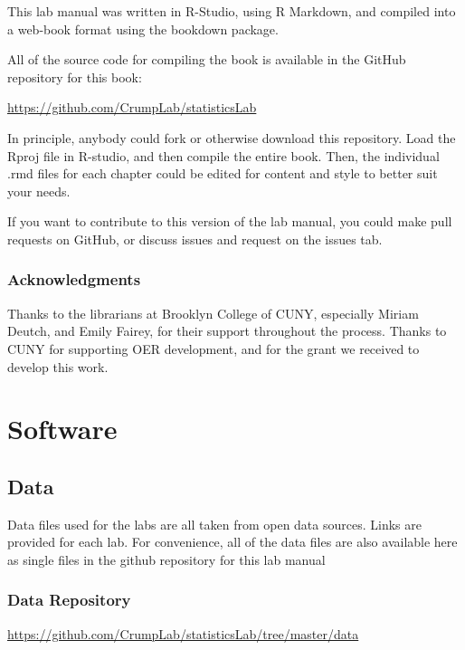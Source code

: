 \documentclass[
]{book}
\begin{document}
This lab manual was written in R-Studio, using R Markdown, and compiled into a web-book format using the bookdown package.

All of the source code for compiling the book is available in the GitHub repository for this book:

\url{https://github.com/CrumpLab/statisticsLab}

In principle, anybody could fork or otherwise download this repository. Load the Rproj file in R-studio, and then compile the entire book. Then, the individual .rmd files for each chapter could be edited for content and style to better suit your needs.

If you want to contribute to this version of the lab manual, you could make pull requests on GitHub, or discuss issues and request on the issues tab.

\hypertarget{acknowledgments}{%
\subsection{Acknowledgments}\label{acknowledgments}}

Thanks to the librarians at Brooklyn College of CUNY, especially Miriam Deutch, and Emily Fairey, for their support throughout the process. Thanks to CUNY for supporting OER development, and for the grant we received to develop this work.

\hypertarget{software}{%
\chapter*{Software}\label{software}}

\hypertarget{data}{%
\section{Data}\label{data}}

Data files used for the labs are all taken from open data sources. Links are provided for each lab. For convenience, all of the data files are also available here as single files in the github repository for this lab manual

\hypertarget{data-repository}{%
\subsection{Data Repository}\label{data-repository}}

\url{https://github.com/CrumpLab/statisticsLab/tree/master/data}
\end{document}
